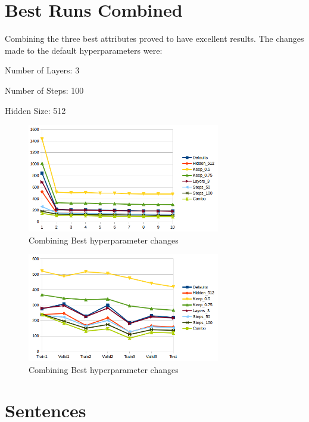 \documentclass[10pt,a4paper]{article}
\begin{document}
\clearpage

\section{Best Runs Combined}

Combining the three best attributes proved to have excellent results. The changes made to the default hyperparameters were:

Number of Layers: 3

Number of Steps: 100

Hidden Size: 512

\begin{figure}[H]
  \begin{center}
    \includegraphics[width=0.75\textwidth] {epochs2.png}
    \caption{Combining Best hyperparameter changes}
  \end{center}
\end{figure}

\begin{figure}[H]
  \begin{center}
    \includegraphics[width=0.75\textwidth] {train-valid-test2.png}
    \caption{Combining Best hyperparameter changes}
  \end{center}
\end{figure}

\clearpage

\section{Sentences}
\end{document}
